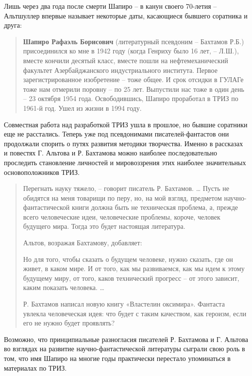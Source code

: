 \documentclass[11pt,a4paper]{article}
\begin{document}
Лишь через два года после смерти Шапиро -- в канун своего 70-летия --
Альтшуллер впервые называет некоторые даты, касающиеся бывшего соратника и
друга: 
\begin{quote}
  \textbf{Шапиро Рафаэль Борисович} (литературный псевдоним -- Бахтамов Р.Б.)
  присоединился ко мне в 1942 году (когда Генриху было 16 лет, -- Л.Ш.),
  вместе кончили десятый класс, вместе пошли на нефтемеханический факультет
  Азербайджанского индустриального института. Первое зарегистрированное
  изобретение -- тоже общее. И срок отсидки в ГУЛАГе тоже нам отмерили поровну
  -- по 25 лет. Выпустили нас тоже в один день -- 23 октября 1954 года.
  Освободившись, Шапиро проработал в ТРИЗ по 1961-й год. Ушел из жизни в 1994
  году.  \cite{Altshuller1996}
\end{quote}
Совместная работа над разработкой ТРИЗ ушла в прошлое, но бывшие соратники еще
не расстались. Теперь уже под псевдонимами писателей-фантастов они продолжали
спорить о путях развития методики творчества. Именно в рассказах и повестях
Г. Альтова и Р. Бахтамова можно наиболее последовательно проследить
становление личностей и мировоззрения этих наиболее значительных
основоположников ТРИЗ.

\begin{quote}
  Перегнать науку тяжело, -- говорит писатель Р. Бахтамов. … Пусть не обидятся
  на меня товарищи по перу, но, на мой взгляд, предметом
  научно-фантасти\-ческой книги должна быть не техническая проблема, а, прежде
  всего человеческие идеи, человеческие проблемы, короче, человек будущего
  мира.  Тогда это будет настоящая литература.

  Альтов, возражая Бахтамову, добавляет:

  Но для того, чтобы сказать о будущем человеке, нужно сказать, где он живет,
  в каком мире. И от того, как мы развиваемся, как мы идем к этому будущему
  миру, от того, каков технический прогресс -- от этого зависит, каким показать
  человека. …

  Р. Бахтамов написал новую книгу «Властелин оксимира». Фантаста увлекла
  человеческая идея: что будет с таким качеством, как героизм, если его не
  нужно будет проявлять? \cite{Amnuel964}
\end{quote}
Возможно, что принципиальные разногласия писателей Р. Бахтамова и Г. Альтова
во взглядах на развитие научно-фантастической литературы сыграли свою роль в
том, что имя Шапиро на многие годы практически перестало упоминаться в
материалах по ТРИЗ.
\end{document}
